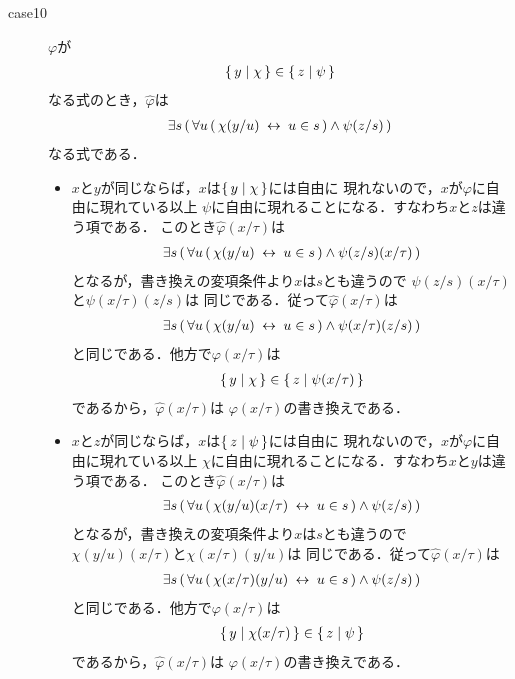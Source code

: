 \begin{metaprf}
\begin{description}
\begin{description}
					\item[case10] $\varphi$が
						\begin{align}
							\{\, y \mid \chi\, \} \in \{\, z \mid \psi\, \}
						\end{align}
						なる式のとき，$\widehat{\varphi}$は
						\begin{align}
							\exists s\, (\, \forall u\, (\, \chi(y/u) \hspace{0.25em}\leftrightarrow\hspace{0.25em} u \in s\, ) \wedge \psi(z/s)\, )
						\end{align}
						なる式である．
						\begin{itemize}
							\item $x$と$y$が同じならば，$x$は$\{\, y \mid \chi\, \}$には自由に
								現れないので，$x$が$\varphi$に自由に現れている以上
								$\psi$に自由に現れることになる．すなわち$x$と$z$は違う項である．
								このとき$\widehat{\varphi}(x/\tau)$は
								\begin{align}
									\exists s\, (\, \forall u\, (\, \chi(y/u) \hspace{0.25em}\leftrightarrow\hspace{0.25em} u \in s\, ) \wedge \psi(z/s)(x/\tau)\, )
								\end{align}
								となるが，書き換えの変項条件より$x$は$s$とも違うので
								$\psi(z/s)(x/\tau)$と$\psi(x/\tau)(z/s)$は
								同じである．従って$\widehat{\varphi}(x/\tau)$は
								\begin{align}
									\exists s\, (\, \forall u\, (\, \chi(y/u) \hspace{0.25em}\leftrightarrow\hspace{0.25em} u \in s\, ) \wedge \psi(x/\tau)(z/s)\, )
								\end{align}
								と同じである．他方で$\varphi(x/\tau)$は
								\begin{align}
									\{\, y \mid \chi\, \} \in \{\, z \mid \psi(x/\tau)\, \}
								\end{align}
								であるから，$\widehat{\varphi}(x/\tau)$は
								$\varphi(x/\tau)$の書き換えである．
								
							\item $x$と$z$が同じならば，$x$は$\{\, z \mid \psi\, \}$には自由に
								現れないので，$x$が$\varphi$に自由に現れている以上
								$\chi$に自由に現れることになる．すなわち$x$と$y$は違う項である．
								このとき$\widehat{\varphi}(x/\tau)$は
								\begin{align}
									\exists s\, (\, \forall u\, (\, \chi(y/u)(x/\tau) \hspace{0.25em}\leftrightarrow\hspace{0.25em} u \in s\, ) \wedge \psi(z/s)\, )
								\end{align}
								となるが，書き換えの変項条件より$x$は$s$とも違うので
								$\chi(y/u)(x/\tau)$と$\chi(x/\tau)(y/u)$は
								同じである．従って$\widehat{\varphi}(x/\tau)$は
								\begin{align}
									\exists s\, (\, \forall u\, (\, \chi(x/\tau)(y/u) \hspace{0.25em}\leftrightarrow\hspace{0.25em} u \in s\, ) \wedge \psi(z/s)\, )
								\end{align}
								と同じである．他方で$\varphi(x/\tau)$は
								\begin{align}
									\{\, y \mid \chi(x/\tau)\, \} \in \{\, z \mid \psi\, \}
								\end{align}
								であるから，$\widehat{\varphi}(x/\tau)$は
								$\varphi(x/\tau)$の書き換えである．
								

\end{itemize}
\end{description}
\end{description}
\end{metaprf}
